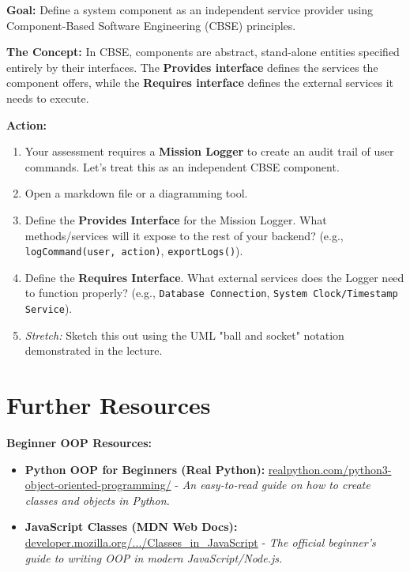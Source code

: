 \documentclass[a4paper,12pt]{article}
\begin{document}
\textbf{Goal:} Define a system component as an independent service provider using Component-Based Software Engineering (CBSE) principles.

\textbf{The Concept:} In CBSE, components are abstract, stand-alone entities specified entirely by their interfaces. The \textbf{Provides interface} defines the services the component offers, while the \textbf{Requires interface} defines the external services it needs to execute.

\vspace{0.3cm}
\textbf{Action:}
\begin{enumerate}
    \item Your assessment requires a \textbf{Mission Logger} to create an audit trail of user commands. Let's treat this as an independent CBSE component.
    \item Open a markdown file or a diagramming tool.
    \item Define the \textbf{Provides Interface} for the Mission Logger. What methods/services will it expose to the rest of your backend? (e.g., \texttt{logCommand(user, action)}, \texttt{exportLogs()}).
    \item Define the \textbf{Requires Interface}. What external services does the Logger need to function properly? (e.g., \texttt{Database Connection}, \texttt{System Clock/Timestamp Service}).
    \item \textit{Stretch:} Sketch this out using the UML "ball and socket" notation demonstrated in the lecture.
\end{enumerate}

\section*{Further Resources}

\textbf{Beginner OOP Resources:}
\begin{itemize}
    \item \textbf{Python OOP for Beginners (Real Python):} \href{https://realpython.com/python3-object-oriented-programming/}{realpython.com/python3-object-oriented-programming/} - \textit{An easy-to-read guide on how to create classes and objects in Python.}
    \item \textbf{JavaScript Classes (MDN Web Docs):} \href{https://developer.mozilla.org/en-US/docs/Learn/JavaScript/Objects/Classes_in_JavaScript}{developer.mozilla.org/.../Classes\_in\_JavaScript} - \textit{The official beginner's guide to writing OOP in modern JavaScript/Node.js.}
\end{itemize}
\end{document}
